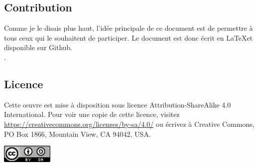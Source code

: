 \subsection{Contribution}
Comme je le disais plus haut, l’idée principale de ce document est de permettre à tous ceux qui le souhaitent de participer. Le document est donc écrit en \LaTeX et disponible sur Github.\\
\cite{jdrp-starwars}.

\subsection{Licence}
Cette \oe{uvre} est mise à disposition sous licence Attribution-ShareAlike 4.0 International. Pour voir une copie de cette licence, visitez \url{https://creativecommons.org/licenses/by-sa/4.0/} ou écrivez à Creative Commons, PO Box 1866, Mountain View, CA 94042, USA.

\begin{flushright}
	\includegraphics[width=70pt]{img/cc-by-sa.png}
\end{flushright}

\twocolumn